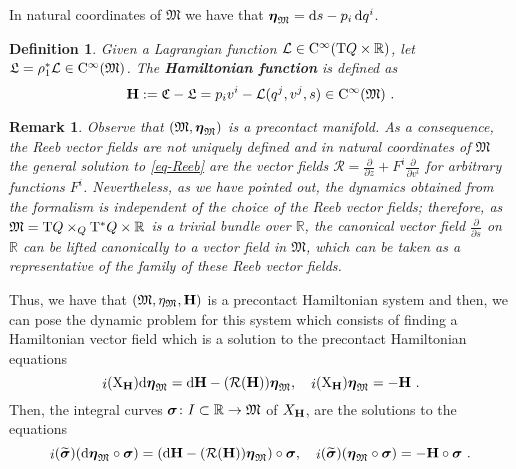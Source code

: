 \documentclass[12pt]{report}
\newtheorem{definition}[teor]{Definition}
\newtheorem{remark}[teor]{Remark}
\def\beq{\begin{equation}}
\def\eeq{\end{equation}}
\def\derpar#1#2{\frac{\partial{#1}}{\partial{#2}}}
\def\Lag{{\cal L}}
\def\d{{\rm d}}
\def\Real{\mathbb{R}}
\def\bmeta{\mbox{\boldmath $\eta$}}
\def\X{{\rm X}}
\def\Tan{{\rm T}}
\def\inn{\mathop{i}\nolimits}
\def\Cinfty{{\rm C}^\infty}
\newcommand{\Reeb}{\mathcal{R}}
\begin{document}
In natural coordinates of $\mathfrak{M}$ we have that
$\bmeta_{\mathfrak{M}}=\d s-p_i\,\d q^i$.

\begin{definition}
Given a Lagrangian function $\Lag\in\Cinfty(\Tan Q\times\Real)$, let
$\mathfrak{L}=\rho_1^*\Lag\in\Cinfty(\mathfrak{M})$.
The \textbf{Hamiltonian function} is defined as
\beq
{\bf H}:=\mathfrak{C}-\mathfrak{L} =p_i v^i-\Lag (q^j,v^j,s)\in\Cinfty(\mathfrak{M}) \ .
\label{Hamf}
\eeq
\end{definition}

\begin{remark}{\rm
Observe that $(\mathfrak{M},\bmeta_{\mathfrak{M}})$ is a precontact manifold.
As a consequence, the Reeb vector fields are not uniquely defined and
in natural coordinates of $\mathfrak{M}$ the general solution to \eqref{eq-Reeb} are the vector fields
$\displaystyle \Reeb=\derpar{}{z}+F^i\derpar{}{v^i}$
for arbitrary functions $F^i$.
Nevertheless, as we have pointed out, 
the dynamics obtained from the formalism is independent of the choice of the Reeb vector fields;
therefore, as $\mathfrak{M}=\Tan Q\times_Q\Tan^*Q\times\Real$
is a trivial bundle over $\Real$,
the canonical vector field $\displaystyle \derpar{}{s}$ on $\Real$
can be lifted canonically to a vector field in $\mathfrak{M}$,
which can be taken as a representative of the family of
these Reeb vector fields.
}\end{remark}

Thus, we have that $(\mathfrak{M},\eta_\mathfrak{M},{\bf H})$
is a precontact Hamiltonian system and then,
we can pose the dynamic problem for this system which consists of finding
a Hamiltonian vector field which is a solution to the precontact Hamiltonian equations
\begin{equation}
\label{Whamilton-contact-eqs}
\inn(\X_{\bf H})\d\bmeta_{\mathfrak{M}}=\d{\bf H}-({\Reeb}({\bf H}))\bmeta_{\mathfrak{M}}
,\quad
\inn(\X_{\bf H})\bmeta_{\mathfrak{M}}=-{\bf H}\ .
\end{equation}
Then, the integral curves $\mbox{\boldmath $\sigma$}\colon I\subset\Real\to\mathfrak{M}$ of $X_{\bf H}$,
are the solutions to the equations
\begin{equation}
\label{Whamilton-contactc-curves-eqs}
\inn(\widetilde{\mbox{\boldmath $\sigma$}})(\d\bmeta_{\mathfrak{M}}\circ\mbox{\boldmath $\sigma$})=\left(\d{\bf H}-({\Reeb}({\bf H}))\bmeta_{\mathfrak{M}}\right)\circ\mbox{\boldmath $\sigma$}
,\quad
 \inn(\widetilde{\mbox{\boldmath $\sigma$}})(\bmeta_{\mathfrak{M}}\circ\mbox{\boldmath $\sigma$})=-{\bf H}\circ\mbox{\boldmath $\sigma$} \ .
    \end{equation}
\end{document}
